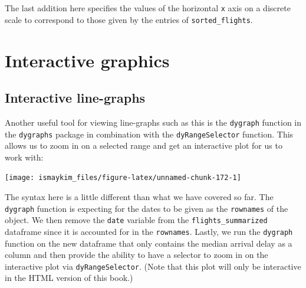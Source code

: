 \documentclass[]{tufte-book}
\newenvironment{Shaded}{\begin{snugshade}}{\end{snugshade}}
\newcommand{\KeywordTok}[1]{\textcolor[rgb]{0.13,0.29,0.53}{\textbf{{#1}}}}
\newcommand{\DataTypeTok}[1]{\textcolor[rgb]{0.13,0.29,0.53}{{#1}}}
\newcommand{\StringTok}[1]{\textcolor[rgb]{0.31,0.60,0.02}{{#1}}}
\newcommand{\OtherTok}[1]{\textcolor[rgb]{0.56,0.35,0.01}{{#1}}}
\newcommand{\NormalTok}[1]{{#1}}
\begin{document}
The last addition here specifies the values of the horizontal \texttt{x}
axis on a discrete scale to correspond to those given by the entries of
\texttt{sorted\_flights}.

\section{Interactive graphics}\label{interactive-graphics}

\subsection{Interactive line-graphs}\label{interactive-line-graphs}

Another useful tool for viewing line-graphs such as this is the
\texttt{dygraph} function in the \texttt{dygraphs} package in
combination with the \texttt{dyRangeSelector} function. This allows us
to zoom in on a selected range and get an interactive plot for us to
work with:

\begin{Shaded}
\end{Shaded}

\begin{center}\texttt{[image: ismaykim\_files/figure-latex/unnamed-chunk-172-1]} \end{center}

The syntax here is a little different than what we have covered so far.
The \texttt{dygraph} function is expecting for the dates to be given as
the \texttt{rownames} of the object. We then remove the \texttt{date}
variable from the \texttt{flights\_summarized} dataframe since it is
accounted for in the \texttt{rownames}. Lastly, we run the
\texttt{dygraph} function on the new dataframe that only contains the
median arrival delay as a column and then provide the ability to have a
selector to zoom in on the interactive plot via
\texttt{dyRangeSelector}. (Note that this plot will only be interactive
in the HTML version of this book.)

\renewcommand{\bibname}{References}

% 
% 
\end{document}
